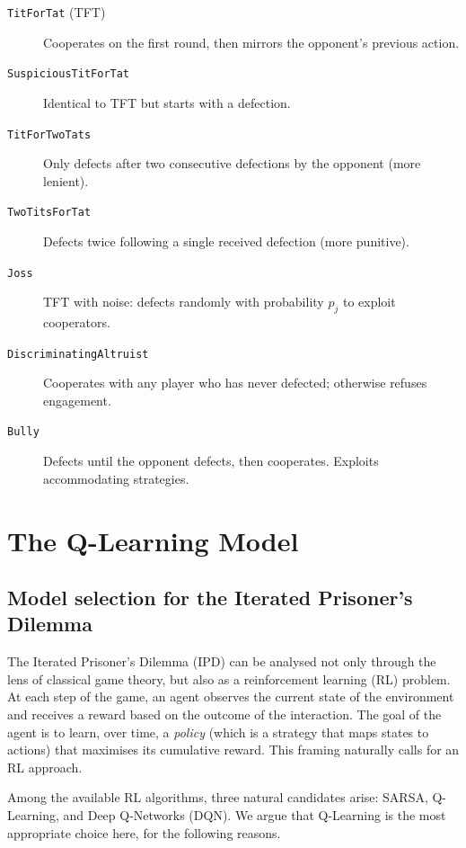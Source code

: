 \documentclass[11pt, a4paper]{article}
\begin{document}
\begin{description}
  \item[\texttt{TitForTat} (TFT)] Cooperates on the first round, then mirrors the opponent's previous action.
  \item[\texttt{SuspiciousTitForTat}] Identical to TFT but starts with a defection.
  \item[\texttt{TitForTwoTats}] Only defects after two consecutive defections by the opponent (more lenient).
  \item[\texttt{TwoTitsForTat}] Defects twice following a single received defection (more punitive).
  \item[\texttt{Joss}] TFT with noise: defects randomly with probability $p_j$ to exploit cooperators.
  \item[\texttt{DiscriminatingAltruist}] Cooperates with any player who has never defected; otherwise refuses engagement.
  \item[\texttt{Bully}] Defects until the opponent defects, then cooperates. Exploits accommodating strategies.
\end{description}
\newpage

\section{The Q-Learning Model}
\label{sec:qlearning}

\subsection{Model selection for the Iterated Prisoner's Dilemma}

The Iterated Prisoner's Dilemma (IPD) can be analysed not only through the lens of classical
game theory, but also as a reinforcement learning (RL) problem. At each step of the game, an
agent observes the current state of the environment and receives a reward based on the outcome
of the interaction. The goal of the agent is to learn, over time, a \textit{policy} (which is a
strategy that maps states to actions) that maximises its cumulative reward. This framing
naturally calls for an RL approach.

Among the available RL algorithms, three natural candidates arise: SARSA, Q-Learning, and Deep
Q-Networks (DQN). We argue that Q-Learning is the most appropriate choice here, for the
following reasons.
\end{document}
